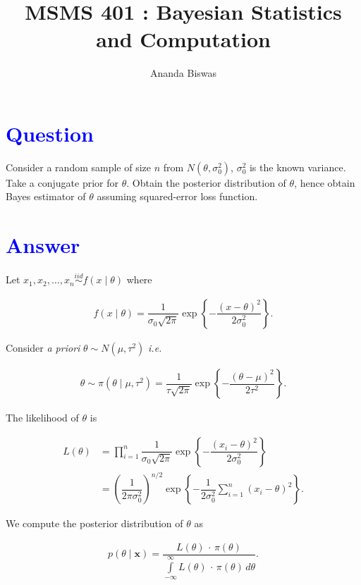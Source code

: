 \documentclass[12pt, a4paper]{article}
\title{MSMS 401 : Bayesian Statistics and Computation}
\author{{\fontsize{25}{20} \benyorithafont Ananda Biswas}}
\date{}
\begin{document}
\maketitle

\section*{\faArrowAltCircleRight[regular] \textcolor{blue}{Question}}

Consider a random sample of size $n$ from $N(\theta, \sigma_0^2)$, $\sigma_0^2$ is the known variance. Take a conjugate prior for $\theta$. Obtain the posterior distribution of $\theta$, hence obtain Bayes estimator of $\theta$ assuming squared-error loss function.

\section*{\faArrowAltCircleRight[regular] \textcolor{blue}{Answer}}

Let $x_1, x_2, \ldots, x_n \overset{iid}{\sim} f(x \mid \theta)$ where

\begin{align*}
f(x \mid \theta) = \dfrac{1}{\sigma_0 \sqrt{2\pi}} \exp\left\{ -\dfrac{(x-\theta)^2}{2\sigma_0^2} \right\}.
\end{align*}

Consider \textit{a priori} $\theta \sim N(\mu, \tau^2)$ \textit{i.e.}

\begin{align*}
\theta \sim \pi(\theta \mid \mu, \tau^2) = \dfrac{1}{\tau\sqrt{2\pi}} \exp\left\{ -\dfrac{(\theta-\mu)^2}{2\tau^2} \right\}.
\end{align*}

\newpage

The likelihood of $\theta$ is

\begin{align*}
L(\theta)
&= \prod_{i=1}^{n} \dfrac{1}{\sigma_0\sqrt{2\pi}} \exp\!\left\{ -\dfrac{(x_i-\theta)^2}{2\sigma_0^2} \right\} \\[0.8em]
&= \left(\dfrac{1}{2\pi\sigma_0^2}\right)^{n/2} \exp\left\{ -\dfrac{1}{2\sigma_0^2} \sum\limits_{i=1}^{n} (x_i-\theta)^2 \right\}.
\end{align*}

We compute the posterior distribution of $\theta$ as

\begin{align*}
p(\theta \mid \mathbf{x}) = \dfrac{L(\theta) \, \cdot \, \pi(\theta)}{\displaystyle \int\limits_{-\infty}^{\infty} L(\theta) \, \cdot \, \pi(\theta) \, d\theta}.
\end{align*}
\end{document}
